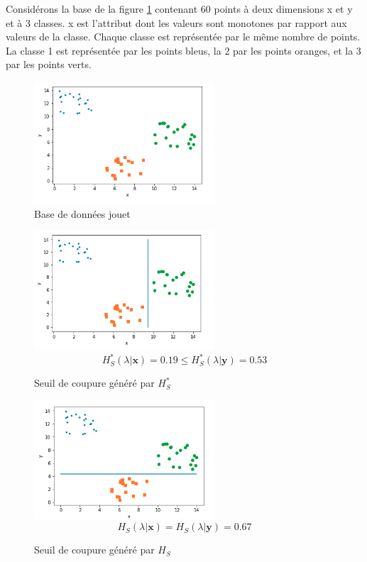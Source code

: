 \documentclass[a4paper]{article}
\begin{document}
Considérons la base de la figure \ref{img:artificial-dataset} contenant 60
points à deux dimensions x et y et à 3 classes. x est l'attribut dont les valeurs sont
monotones par rapport aux valeurs de la classe. Chaque classe est représentée
par le même nombre de points. La classe 1 est
représentée par les points bleus, la 2 par les points oranges, et la 3 par les
points verts. 

\begin{figure}[H]
	\center 
	\includegraphics[width=0.6\textwidth]{images/artificial-dataset.png}
    \caption{Base de données jouet}
    \label{img:artificial-dataset}
\end{figure}

\begin{figure}[H]
	\center 
	\includegraphics[width=0.6\textwidth]{images/threshold_rsdm.png}
    $$H^*_S(\lambda | \mathbf{x}) =  0.19 \leq H^*_S(\lambda | \mathbf{y}) =  0.53$$
    \caption{Seuil de coupure généré par $H^*_S$}
    \label{img:threshold_rsdm}
\end{figure}

\begin{figure}[H]
	\center 
	\includegraphics[width=0.6\textwidth]{images/threshold_sdm.png}
    $$H_S(\lambda | \mathbf{x}) = H_S(\lambda | \mathbf{y}) =  0.67$$
    \caption{Seuil de coupure généré par $H_S$}
    \label{img:threshold_sdm}
\end{figure}
\end{document}

